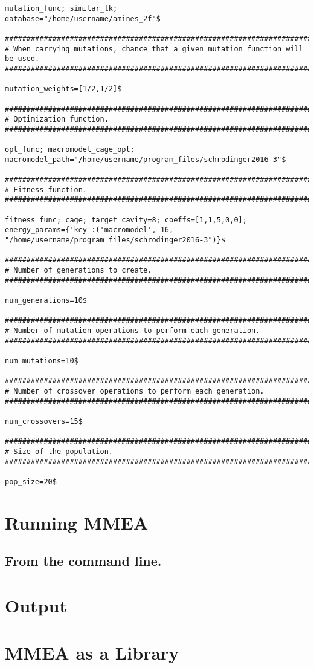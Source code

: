 \documentclass[12pt]{article}
\begin{document}
\begin{Verbatim}
mutation_func; similar_lk;
database="/home/username/amines_2f"$

##################################################################################
# When carrying mutations, chance that a given mutation function will be used.
##################################################################################

mutation_weights=[1/2,1/2]$

##################################################################################
# Optimization function.
##################################################################################

opt_func; macromodel_cage_opt;
macromodel_path="/home/username/program_files/schrodinger2016-3"$

##################################################################################
# Fitness function.
##################################################################################

fitness_func; cage; target_cavity=8; coeffs=[1,1,5,0,0];
energy_params={'key':('macromodel', 16, "/home/username/program_files/schrodinger2016-3")}$

##################################################################################
# Number of generations to create.
##################################################################################

num_generations=10$

##################################################################################
# Number of mutation operations to perform each generation.
##################################################################################

num_mutations=10$

##################################################################################
# Number of crossover operations to perform each generation.
##################################################################################

num_crossovers=15$

##################################################################################
# Size of the population.
##################################################################################

pop_size=20$
\end{Verbatim}

\section{Running MMEA}

\subsection{From the command line.}


\section{Output}

\section{MMEA as a Library}
\end{document}

